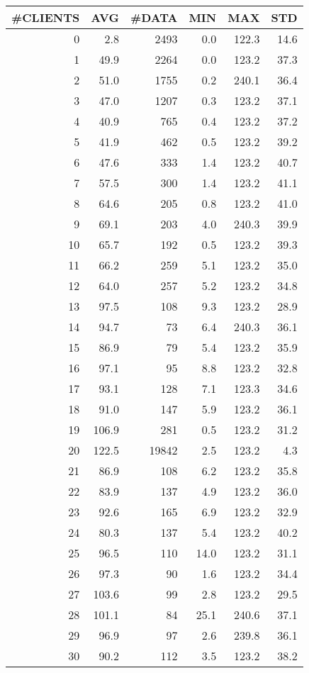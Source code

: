 \begin{tabular}{|r|r|r|r|r|r|}
\hline
 \#CLIENTS & AVG & \#DATA & MIN & MAX & STD\\
\hline
0 &  2.8 & 2493 & 0.0 & 122.3 & 14.6\\
1 &  49.9 & 2264 & 0.0 & 123.2 & 37.3\\
2 &  51.0 & 1755 & 0.2 & 240.1 & 36.4\\
3 &  47.0 & 1207 & 0.3 & 123.2 & 37.1\\
4 &  40.9 & 765 & 0.4 & 123.2 & 37.2\\
5 &  41.9 & 462 & 0.5 & 123.2 & 39.2\\
6 &  47.6 & 333 & 1.4 & 123.2 & 40.7\\
7 &  57.5 & 300 & 1.4 & 123.2 & 41.1\\
8 &  64.6 & 205 & 0.8 & 123.2 & 41.0\\
9 &  69.1 & 203 & 4.0 & 240.3 & 39.9\\
10 &  65.7 & 192 & 0.5 & 123.2 & 39.3\\
11 &  66.2 & 259 & 5.1 & 123.2 & 35.0\\
12 &  64.0 & 257 & 5.2 & 123.2 & 34.8\\
13 &  97.5 & 108 & 9.3 & 123.2 & 28.9\\
14 &  94.7 & 73 & 6.4 & 240.3 & 36.1\\
15 &  86.9 & 79 & 5.4 & 123.2 & 35.9\\
16 &  97.1 & 95 & 8.8 & 123.2 & 32.8\\
17 &  93.1 & 128 & 7.1 & 123.3 & 34.6\\
18 &  91.0 & 147 & 5.9 & 123.2 & 36.1\\
19 &  106.9 & 281 & 0.5 & 123.2 & 31.2\\
20 &  122.5 & 19842 & 2.5 & 123.2 & 4.3\\
21 &  86.9 & 108 & 6.2 & 123.2 & 35.8\\
22 &  83.9 & 137 & 4.9 & 123.2 & 36.0\\
23 &  92.6 & 165 & 6.9 & 123.2 & 32.9\\
24 &  80.3 & 137 & 5.4 & 123.2 & 40.2\\
25 &  96.5 & 110 & 14.0 & 123.2 & 31.1\\
26 &  97.3 & 90 & 1.6 & 123.2 & 34.4\\
27 &  103.6 & 99 & 2.8 & 123.2 & 29.5\\
28 &  101.1 & 84 & 25.1 & 240.6 & 37.1\\
29 &  96.9 & 97 & 2.6 & 239.8 & 36.1\\
30 &  90.2 & 112 & 3.5 & 123.2 & 38.2\\

\end{tabular}
